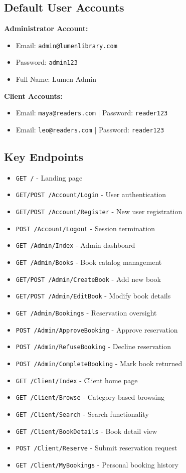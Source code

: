 \documentclass[12pt,a4paper]{article}
\begin{document}
\subsection{Default User Accounts}

\textbf{Administrator Account:}
\begin{itemize}[leftmargin=*]
    \item Email: \texttt{admin@lumenlibrary.com}
    \item Password: \texttt{admin123}
    \item Full Name: Lumen Admin
\end{itemize}

\textbf{Client Accounts:}
\begin{itemize}[leftmargin=*]
    \item Email: \texttt{maya@readers.com} | Password: \texttt{reader123}
    \item Email: \texttt{leo@readers.com} | Password: \texttt{reader123}
\end{itemize}

\subsection{Key Endpoints}

\begin{itemize}[leftmargin=*]
    \item \texttt{GET /} - Landing page
    \item \texttt{GET/POST /Account/Login} - User authentication
    \item \texttt{GET/POST /Account/Register} - New user registration
    \item \texttt{POST /Account/Logout} - Session termination
    \item \texttt{GET /Admin/Index} - Admin dashboard
    \item \texttt{GET /Admin/Books} - Book catalog management
    \item \texttt{GET/POST /Admin/CreateBook} - Add new book
    \item \texttt{GET/POST /Admin/EditBook} - Modify book details
    \item \texttt{GET /Admin/Bookings} - Reservation oversight
    \item \texttt{POST /Admin/ApproveBooking} - Approve reservation
    \item \texttt{POST /Admin/RefuseBooking} - Decline reservation
    \item \texttt{POST /Admin/CompleteBooking} - Mark book returned
    \item \texttt{GET /Client/Index} - Client home page
    \item \texttt{GET /Client/Browse} - Category-based browsing
    \item \texttt{GET /Client/Search} - Search functionality
    \item \texttt{GET /Client/BookDetails} - Book detail view
    \item \texttt{POST /Client/Reserve} - Submit reservation request
    \item \texttt{GET /Client/MyBookings} - Personal booking history
\end{itemize}
\end{document}
